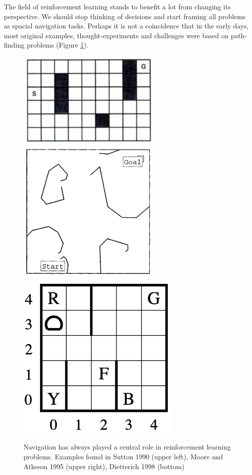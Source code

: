 \documentclass[12pt]{article}
\begin{document}
The field of reinforcement learning stands to benefit a lot from changing  its perspective. We should stop thinking of decisions and start framing all problems as spacial navigation tasks. Perhaps it is not a coincidence that in the early days, most original examples, thought-experiments and challenges were based on path-finding problems (Figure \ref{fig:rl_problems}).

\begin{figure}[!htbp]
	\includegraphics[width=7cm]{dyna}
	\includegraphics[width=7cm]{parti_game}
	\includegraphics[width=8cm]{maxq}
	\caption{Navigation has always played a central role in reinforcement learning problems. Examples found in Sutton 1990 \cite{dyna} (upper left), Moore and Atkeson 1995 \cite{parti_game} (upper right), Dietterich 1998 \cite{maxq} (bottom) }
	\label{fig:rl_problems}
\end{figure}
\end{document}
